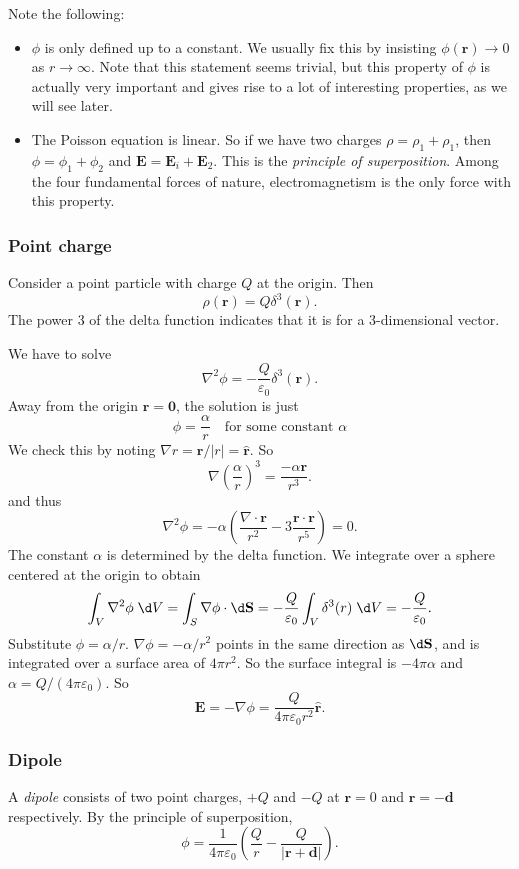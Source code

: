 \documentclass[a4paper]{article}
\begin{document}
Note the following:
\begin{itemize}
  \item $\phi$ is only defined up to a constant. We usually fix this by insisting $\phi(\mathbf{r}) \to 0$ as $r\to \infty$. Note that this statement seems trivial, but this property of $\phi$ is actually very important and gives rise to a lot of interesting properties, as we will see later.
  \item The Poisson equation is linear. So if we have two charges $\rho = \rho_1 + \rho_1$, then $\phi = \phi_1 + \phi_2$ and $\mathbf{E} = \mathbf{E}_i + \mathbf{E}_2$. This is the \emph{principle of superposition}. Among the four fundamental forces of nature, electromagnetism is the only force with this property.
\end{itemize}
\subsubsection{Point charge}
Consider a point particle with charge $Q$ at the origin. Then
\[
  \rho (\mathbf{r}) = Q\delta^3(\mathbf{r}).
\]
The power 3 of the delta function indicates that it is for a 3-dimensional vector.

We have to solve
\[
  \nabla^2\phi = -\frac{Q}{\varepsilon_0}\delta^3(\mathbf{r}).
\]
Away from the origin $\mathbf{r} = \mathbf{0}$, the solution is just
\[
  \phi = \frac{\alpha}{r}\quad \text{for some constant }\alpha
\]
We check this by noting $\nabla r = \mathbf{r}/|r| = \hat{\mathbf{r}}$. So
\[
  \nabla\left(\frac{\alpha}{r}\right)^3 = \frac{-\alpha\mathbf{r}}{r^3}.
\]
and thus
\[
  \nabla^2 \phi = -\alpha\left(\frac{\nabla\cdot \mathbf{r}}{r^2} - 3\frac{\mathbf{r}\cdot \mathbf{r}}{r^5}\right) = 0.
\]
The constant $\alpha$ is determined by the delta function. We integrate over a sphere centered at the origin to obtain
\[
  \int_V \nabla^2\phi\;\d V = \int_S \nabla\phi\cdot\d \mathbf{S} = -\frac{Q}{\varepsilon_0}\int_V\delta^3(r)\; \d V = -\frac{Q}{\varepsilon_0}.
\]
Substitute $\phi = \alpha/r$. $\nabla \phi = -\alpha/r^2$ points in the same direction as $\d \mathbf{S}$, and is integrated over a surface area of $4\pi r^2$. So the surface integral is $-4\pi\alpha$ and $\alpha = Q/(4\pi\varepsilon_0)$. So
\[
  \mathbf{E} = -\nabla \phi = \frac{Q}{4\pi\varepsilon_0 r^2}\hat{\mathbf{r}}.
\]

\subsubsection{Dipole}
\begin{defi}[Dipole]
  A \emph{dipole} consists of two point charges, $+Q$ and $-Q$ at $\mathbf{r} = 0$ and $\mathbf{r} = -\mathbf{d}$ respectively. By the principle of superposition,
  \[
    \phi = \frac{1}{4\pi\varepsilon_0}\left(\frac{Q}{r} - \frac{Q}{|\mathbf{r} + \mathbf{d}|}\right).
  \]
\end{defi}
\end{document}
